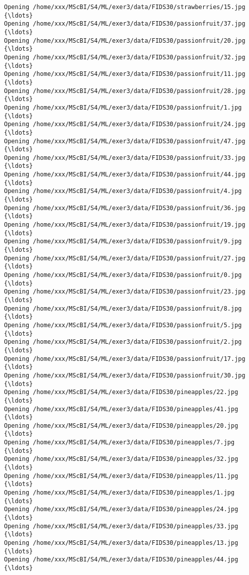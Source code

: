 \documentclass[11pt]{article}
\begin{document}
\begin{Verbatim}[commandchars=\\\{\}]
Opening /home/xxx/MScBI/S4/ML/exer3/data/FIDS30/strawberries/15.jpg  {\ldots}
Opening /home/xxx/MScBI/S4/ML/exer3/data/FIDS30/passionfruit/37.jpg  {\ldots}
Opening /home/xxx/MScBI/S4/ML/exer3/data/FIDS30/passionfruit/20.jpg  {\ldots}
Opening /home/xxx/MScBI/S4/ML/exer3/data/FIDS30/passionfruit/32.jpg  {\ldots}
Opening /home/xxx/MScBI/S4/ML/exer3/data/FIDS30/passionfruit/11.jpg  {\ldots}
Opening /home/xxx/MScBI/S4/ML/exer3/data/FIDS30/passionfruit/28.jpg  {\ldots}
Opening /home/xxx/MScBI/S4/ML/exer3/data/FIDS30/passionfruit/1.jpg  {\ldots}
Opening /home/xxx/MScBI/S4/ML/exer3/data/FIDS30/passionfruit/24.jpg  {\ldots}
Opening /home/xxx/MScBI/S4/ML/exer3/data/FIDS30/passionfruit/47.jpg  {\ldots}
Opening /home/xxx/MScBI/S4/ML/exer3/data/FIDS30/passionfruit/33.jpg  {\ldots}
Opening /home/xxx/MScBI/S4/ML/exer3/data/FIDS30/passionfruit/44.jpg  {\ldots}
Opening /home/xxx/MScBI/S4/ML/exer3/data/FIDS30/passionfruit/4.jpg  {\ldots}
Opening /home/xxx/MScBI/S4/ML/exer3/data/FIDS30/passionfruit/36.jpg  {\ldots}
Opening /home/xxx/MScBI/S4/ML/exer3/data/FIDS30/passionfruit/19.jpg  {\ldots}
Opening /home/xxx/MScBI/S4/ML/exer3/data/FIDS30/passionfruit/9.jpg  {\ldots}
Opening /home/xxx/MScBI/S4/ML/exer3/data/FIDS30/passionfruit/27.jpg  {\ldots}
Opening /home/xxx/MScBI/S4/ML/exer3/data/FIDS30/passionfruit/0.jpg  {\ldots}
Opening /home/xxx/MScBI/S4/ML/exer3/data/FIDS30/passionfruit/23.jpg  {\ldots}
Opening /home/xxx/MScBI/S4/ML/exer3/data/FIDS30/passionfruit/8.jpg  {\ldots}
Opening /home/xxx/MScBI/S4/ML/exer3/data/FIDS30/passionfruit/5.jpg  {\ldots}
Opening /home/xxx/MScBI/S4/ML/exer3/data/FIDS30/passionfruit/2.jpg  {\ldots}
Opening /home/xxx/MScBI/S4/ML/exer3/data/FIDS30/passionfruit/17.jpg  {\ldots}
Opening /home/xxx/MScBI/S4/ML/exer3/data/FIDS30/passionfruit/30.jpg  {\ldots}
Opening /home/xxx/MScBI/S4/ML/exer3/data/FIDS30/pineapples/22.jpg  {\ldots}
Opening /home/xxx/MScBI/S4/ML/exer3/data/FIDS30/pineapples/41.jpg  {\ldots}
Opening /home/xxx/MScBI/S4/ML/exer3/data/FIDS30/pineapples/20.jpg  {\ldots}
Opening /home/xxx/MScBI/S4/ML/exer3/data/FIDS30/pineapples/7.jpg  {\ldots}
Opening /home/xxx/MScBI/S4/ML/exer3/data/FIDS30/pineapples/32.jpg  {\ldots}
Opening /home/xxx/MScBI/S4/ML/exer3/data/FIDS30/pineapples/11.jpg  {\ldots}
Opening /home/xxx/MScBI/S4/ML/exer3/data/FIDS30/pineapples/1.jpg  {\ldots}
Opening /home/xxx/MScBI/S4/ML/exer3/data/FIDS30/pineapples/24.jpg  {\ldots}
Opening /home/xxx/MScBI/S4/ML/exer3/data/FIDS30/pineapples/33.jpg  {\ldots}
Opening /home/xxx/MScBI/S4/ML/exer3/data/FIDS30/pineapples/13.jpg  {\ldots}
Opening /home/xxx/MScBI/S4/ML/exer3/data/FIDS30/pineapples/44.jpg  {\ldots}

\end{Verbatim}
\end{document}
